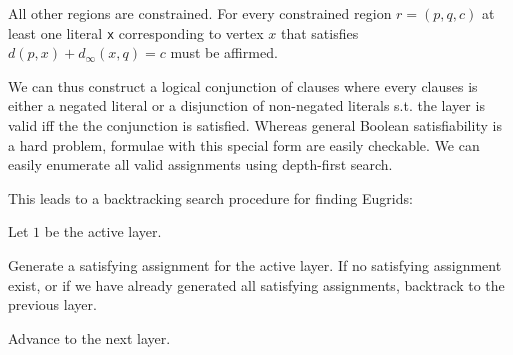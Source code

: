 \documentclass[letterpaper]{article}
\begin{document}
All other regions are constrained. For every constrained region $r = (p, q, c)$ at least one
literal \verb|x| corresponding to vertex $x$ that satisfies $d(p, x) + d_{\infty}(x, q) = c$
must be affirmed.

We can thus construct a logical conjunction of clauses where every clauses is either a
negated literal or a disjunction of non-negated literals s.t. the layer is valid iff the the
conjunction is satisfied. Whereas general Boolean satisfiability is a hard problem, formulae
with this special form are easily checkable. We can easily enumerate all valid assignments
using depth-first search.

This leads to a backtracking search procedure for finding Eugrids:

Let $1$ be the active layer.

Generate a satisfying assignment for the active layer. If no satisfying assignment exist, or
if we have already generated all satisfying assignments, backtrack to the previous layer.

Advance to the next layer.
\end{document}
